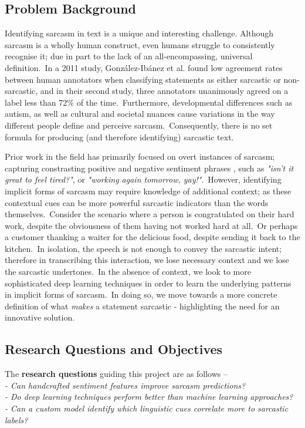 \documentclass[12pt,a4paper]{article}
\begin{document}
\subsection{Problem Background}\vspace{-4.2pt}
\noindent Identifying sarcasm in text is a unique and interesting challenge. Although sarcasm is a wholly human construct, even humans struggle to consistently recognise it; due in part to the lack of an all-encompassing, universal definition.\ In a 2011 study, Gonz{\'a}lez-Ib{\'a}nez et al. \cite{gonzalez2011identifying} found low agreement rates between human annotators when classifying statements as either sarcastic or non-sarcastic, and in their second study, three annotators unanimously agreed on a label less than 72\% of the time.\ Furthermore, developmental differences such as autism, as well as cultural and societal nuances cause variations in the way different people define and perceive sarcasm.\ Consequently, there is no set formula for producing (and therefore identifying) sarcastic text.

Prior work in the field has primarily focused on overt instances of sarcasm; capturing constrasting positive and negative sentiment phrases \cite{riloff2013sarcasm}, such as \textit{"isn't it great to feel tired?"}, or \textit{"working again tomorrow, yay!"}.\ However, identifying implicit forms of sarcasm may require knowledge of additional context; as these contextual cues can be more powerful sarcastic indicators than the words themselves.\ Consider the scenario where a person is congratulated on their hard work, despite the obviousness of them having not worked hard at all.\ Or perhaps a customer thanking a waiter for the delicious food, despite sending it back to the kitchen.\ In isolation, the speech is not enough to convey the sarcastic intent; therefore in transcribing this interaction, we lose necessary context and we lose the sarcastic undertones.\ In the absence of context, we look to more sophisticated deep learning techniques in order to learn the underlying patterns in implicit forms of sarcasm.\ In doing so, we move towards a more concrete definition of what \textit{makes} a statement sarcastic - highlighting the need for an innovative solution.

\subsection{Research Questions and Objectives}
\vspace{-4.2pt}
\noindent The \textbf{research questions} guiding this project are as follows --\\
\indent \textit{- Can handcrafted sentiment features improve sarcasm predictions?}\\ 
\indent \textit{- Do deep learning techniques perform better than machine learning approaches?}\\ 
\indent \textit{- Can a custom model identify which linguistic cues correlate more to sarcastic labels?}\\
\end{document}
